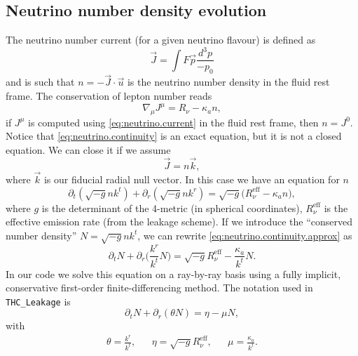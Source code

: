 \subsection{Neutrino number density evolution}
The neutrino number current (for a given neutrino flavour) is defined as
\begin{equation}\label{eq:neutrino.current}
  \vec{J} = \int F \vec{p} \frac{d^3 p}{-p_0}
\end{equation}
and is such that $n = -\vec{J}\cdot\vec{u}$ is the neutrino number density in
the fluid rest frame. The conservation of lepton number reads
\begin{equation}\label{eq:neutrino.continuity}
  \nabla_\mu J^{\mu} = R_\nu - \kappa_a n,
\end{equation}
if $J^\mu$ is computed using \eqref{eq:neutrino.current} in the fluid
rest frame, then $n = J^0$. Notice that \eqref{eq:neutrino.continuity} is an
exact equation, but it is not a closed equation. We can close it if we assume
\begin{equation}
  \vec{J} = n \vec{k},
\end{equation}
where $\vec{k}$ is our fiducial radial null vector. In this case we have an
equation for $n$
\begin{equation}\label{eq:neutrino.continuity.approx}
  \partial_t (\sqrt{-g} n k^t) + \partial_r (\sqrt{-g} n k^r) =
    \sqrt{-g}\big( R_\nu^{\mathrm{eff}} - \kappa_a n ),
\end{equation}
where $g$ is the determinant of the 4-metric (in spherical coordinates),
$R_\nu^{\mathrm{eff}}$ is the effective emission rate (from the leakage
scheme). If we introduce the ``conserved number density'' $N = \sqrt{-g}
n k^t$, we can rewrite \eqref{eq:neutrino.continuity.approx} as
\begin{equation}
  \partial_t N + \partial_r \Big(\frac{k^r}{k^t} N\Big) = \sqrt{-g}
  R_\nu^{\mathrm{eff}} - \frac{\kappa_a}{k^t} N.
\end{equation}
In our code we solve this equation on a ray-by-ray basis using a fully implicit,
conservative first-order finite-differencing method. The notation used in
\texttt{THC\_Leakage} is
\begin{equation}
  \partial_t N + \partial_r (\theta N) = \eta - \mu N,
\end{equation}
with
\begin{align}
  \theta = \frac{k^r}{k^t}, &&
  \eta = \sqrt{-g} R_\nu^{\mathrm{eff}}, &&
  \mu = \frac{\kappa_a}{k^t}.
\end{align}

